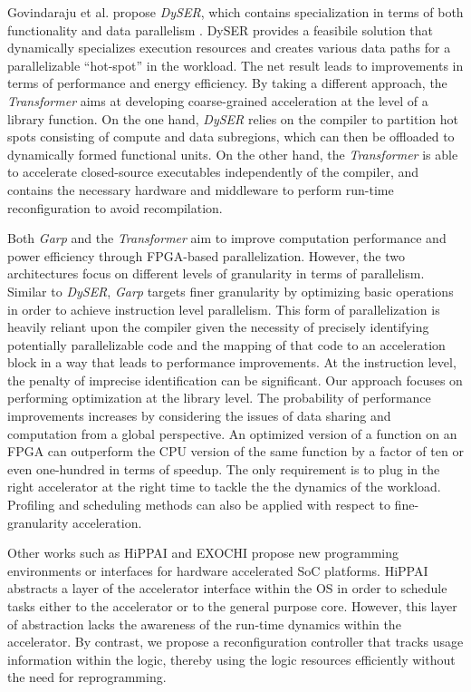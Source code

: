 Govindaraju et al. propose {\em DySER}, which contains specialization in terms of both functionality and
data parallelism \cite{Govindaraju:2012fn,Govindaraju:HPCA11}. DySER
provides a feasibile solution that dynamically specializes execution
resources and creates various data paths for a parallelizable
``hot-spot'' in the workload. The net result leads to improvements in terms of performance and energy
efficiency. By taking a different approach, the {\em Transformer} aims at developing
coarse-grained acceleration at the level of a library function. On the one hand,
{\em DySER} relies on the compiler to partition hot spots consisting of compute and
data subregions, which can then be offloaded to dynamically formed functional
units. On the other hand, the {\em Transformer} is able to accelerate closed-source executables independently of the compiler, and contains
the necessary hardware and middleware to perform run-time reconfiguration to avoid
recompilation.

Both {\em Garp} \cite{Garp:1997,Garp:2000} and the {\em Transformer} aim to improve computation performance and power
efficiency through FPGA-based parallelization. However, the two
architectures focus on different levels of granularity in terms of parallelism. Similar
to {\em DySER}, {\em Garp} targets finer granularity by
optimizing basic operations in order to achieve instruction level
parallelism. This form of parallelization is heavily reliant upon the compiler given the necessity of
precisely identifying potentially parallelizable code and the mapping of that code
to an acceleration block in a way that leads to performance improvements.
At the instruction level, the penalty of imprecise identification can be significant.
Our approach focuses on performing optimization at the library level.
The probability of performance improvements increases by considering the issues of data sharing and computation from a global
perspective. 
An optimized version of a function on an FPGA can outperform the CPU version of the same
function by a factor of ten or even one-hundred in terms of speedup. The only requirement is to 
plug in the right accelerator at the right time to tackle the
the dynamics of the workload. Profiling and scheduling methods can also be applied with respect to fine-granularity acceleration.

Other works such as HiPPAI \cite{Stillwell:2009if} and EXOCHI
\cite{Wang:2007bc} propose new programming environments or interfaces
for hardware accelerated SoC platforms. HiPPAI abstracts a layer of the
accelerator interface within the OS in order to schedule tasks either to the
accelerator or to the general purpose core. However, this layer of
abstraction lacks the awareness of the run-time dynamics within the
accelerator. By contrast, we propose a reconfiguration controller that
 tracks usage information within the logic, thereby using 
the logic resources efficiently without the need for reprogramming. 

